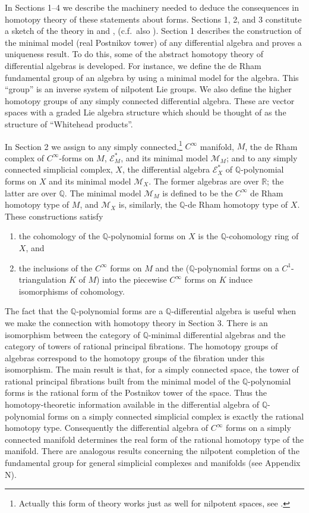 \documentclass[11pt]{amsart}
\theoremstyle{plain}
\theoremstyle{definition}
\newcommand{\sE}{\mathscr{E}}
\newcommand{\cM}{\mathcal{M}}
\newcommand{\RR}{\mathbb{R}}
\newcommand{\QQ}{\mathbb{Q}}
\begin{document}
In Sections 1--4 we describe the machinery needed to deduce the consequences in homotopy theory of these statements about forms. Sections 1, 2, and 3 constitute a sketch of the theory in \cite{S1} and \cite{S3}, (c.f.\ also \cite{Q}). Section 1 describes the construction of the minimal model (real Postnikov tower) of any differential algebra and proves a uniqueness result. To do this, some of the abstract homotopy theory of differential algebras is developed. For instance, we define the de Rham fundamental group of an algebra by using a minimal model for the algebra. This ``group'' is an inverse system of nilpotent Lie groups. We also define the higher homotopy groups of any simply connected differential algebra. These are vector spaces with a graded Lie algebra structure which should be thought of as the structure of ``Whitehead products''.

In Section 2 we assign to any simply connected,\footnote{Actually this form of theory works just as well for nilpotent spaces, see \cite{S2}.} $C^{\infty}$ manifold, $M$, the de Rham complex of $C^{\infty}$-forms on $M$, $\sE^{*}_{M}$, and its minimal model $\cM_{M}$; and to any simply connected simplicial complex, $X$, the differential algebra $\sE^{*}_{X}$ of $\QQ$-polynomial forms on $X$ and its minimal model $\cM_{X}$. The former algebras are over $\RR$; the latter are over $\QQ$. The minimal model $\cM_{M}$ is defined to be the $C^{\infty}$ de Rham homotopy type of $M$, and $\cM_{X}$ is, similarly, the $\QQ$-de Rham homotopy type of $X$. These constructions satisfy
\begin{enumerate}
\item[(a)] the cohomology of the $\QQ$-polynomial forms on $X$ is the $\QQ$-cohomology ring of $X$, and
\item[(b)] the inclusions of the $C^{\infty}$ forms on $M$ and the ($\QQ$-polynomial forms on a $C^{1}$-triangulation $K$ of $M$) into the piecewise $C^{\infty}$ forms on $K$ induce isomorphisms of cohomology.
\end{enumerate}

The fact that the $\QQ$-polynomial forms are a $\QQ$-differential algebra is useful when we make the connection with homotopy theory in Section 3. There is an isomorphism between the category of $\QQ$-minimal differential algebras and the category of towers of rational principal fibrations. The homotopy groups of algebras correspond to the homotopy groups of the fibration under this isomorphism. The main result is that, for a simply connected space, the tower of rational principal fibrations built from the minimal model of the $\QQ$-polynomial forms is the rational form of the Postnikov tower of the space. Thus the homotopy-theoretic information available in the differential algebra of $\QQ$-polynomial forms on a simply connected simplicial complex is exactly the rational homotopy type. Consequently the differential algebra of $C^{\infty}$ forms on a simply connected manifold determines the real form of the rational homotopy type of the manifold. There are analogous results concerning the nilpotent completion of the fundamental group for general simplicial complexes and manifolds (see \cite{S3} Appendix N).
\end{document}
